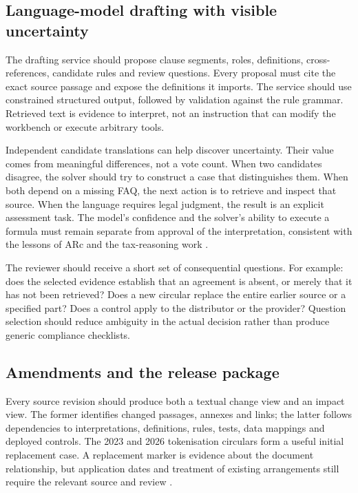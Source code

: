 \subsection{Language-model drafting with visible uncertainty}

The drafting service should propose clause segments, roles, definitions,
cross-references, candidate rules and review questions. Every proposal must cite
the exact source passage and expose the definitions it imports. The service
should use constrained structured output, followed by validation against the
rule grammar. Retrieved text is evidence to interpret, not an instruction that
can modify the workbench or execute arbitrary tools.

Independent candidate translations can help discover uncertainty. Their value
comes from meaningful differences, not a vote count. When two candidates disagree,
the solver should try to construct a case that distinguishes them. When both
depend on a missing FAQ, the next action is to retrieve and inspect that source.
When the language requires legal judgment, the result is an explicit assessment
task. The model's confidence and the solver's ability to execute a formula must
remain separate from approval of the interpretation, consistent with the lessons
of ARc and the tax-reasoning work \citep{arc2025,jurayj2026}.

The reviewer should receive a short set of consequential questions. For example:
does the selected evidence establish that an agreement is absent, or merely that
it has not been retrieved? Does a new circular replace the entire earlier source
or a specified part? Does a control apply to the distributor or the provider?
Question selection should reduce ambiguity in the actual decision rather than
produce generic compliance checklists.

\subsection{Amendments and the release package}

Every source revision should produce both a textual change view and an impact
view. The former identifies changed passages, annexes and links; the latter
follows dependencies to interpretations, definitions, rules, tests, data mappings
and deployed controls. The 2023 and 2026 tokenisation circulars form a useful
initial replacement case. A replacement marker is evidence about the document
relationship, but application dates and treatment of existing arrangements still
require the relevant source and review \citep{sfctoken2023,sfctoken2026}.

